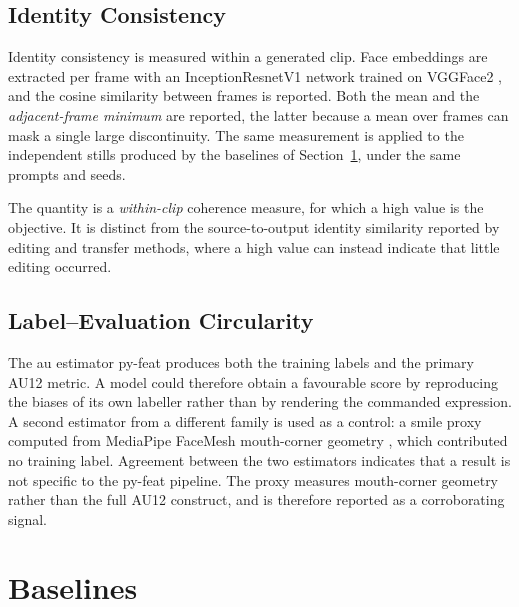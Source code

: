 \subsection{Identity Consistency}\label{subsec:eval-identity}

Identity consistency is measured within a generated clip. Face embeddings are extracted per
frame with an InceptionResnetV1 network trained on VGGFace2
\citep{schroff2015facenet, cao2018vggface2}, and the cosine similarity between frames is
reported. Both the mean and the \emph{adjacent-frame minimum} are reported, the latter
because a mean over frames can mask a single large discontinuity. The same measurement is
applied to the independent stills produced by the baselines of
Section~\ref{sec:method-baselines}, under the same prompts and seeds.

The quantity is a \emph{within-clip} coherence measure, for which a high value is the
objective. It is distinct from the source-to-output identity similarity reported by editing
and transfer methods, where a high value can instead indicate that little editing occurred.

\subsection{Label--Evaluation Circularity}\label{subsec:eval-circularity}

The \gls{au} estimator py-feat produces both the training labels and the primary AU12 metric. A model could
therefore obtain a favourable score by reproducing the biases of its own labeller rather
than by rendering the commanded expression. A second estimator from a different family is
used as a control: a smile proxy computed from MediaPipe FaceMesh mouth-corner geometry
\citep{lugaresi2019mediapipe}, which contributed no training label. Agreement between the
two estimators indicates that a result is not specific to the py-feat pipeline. The proxy
measures mouth-corner geometry rather than the full AU12 construct, and is therefore
reported as a corroborating signal.

\section{Baselines}\label{sec:method-baselines}

